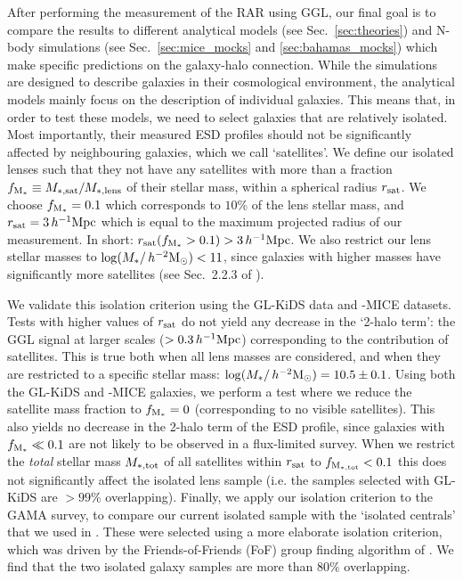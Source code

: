 \documentclass[usenatbib]{mnras}
\newcommand{\hmsun}{\,h^{-2} {\rm M_\odot}}
\newcommand{\hMpc}{\, h^{-1}{\rm{Mpc}} }
\newcommand{\un}[1]{_{\rm #1}}
\begin{document}
After performing the measurement of the RAR using GGL, our final goal is to compare the results to different analytical models (see Sec.~\ref{sec:theories}) and N-body simulations (see Sec.~\ref{sec:mice_mocks} and \ref{sec:bahamas_mocks}) which make specific predictions on the galaxy-halo connection. While the simulations are designed to describe galaxies in their cosmological environment, the analytical models mainly focus on the description of individual galaxies. This means that, in order to test these models, we need to select galaxies that are relatively isolated. Most importantly, their measured ESD profiles should not be significantly affected by neighbouring galaxies, which we call `satellites'. We define our isolated lenses such that they not have any satellites with more than a fraction $f\un{M_*} \equiv M\un{*,sat}/M\un{*,lens}$ of their stellar mass, within a spherical radius $r\un{sat}$. We choose $f\un{M_*}=0.1$ which corresponds to $10\%$ of the lens stellar mass, and $r\un{sat}=3\hMpc$ which is equal to the maximum projected radius of our measurement. In short: $r\un{sat}(f\un{M_*}>0.1)>3\hMpc$. We also restrict our lens stellar masses to $\log(M_*/\hmsun)<11$, since galaxies with higher masses have significantly more satellites (see Sec.~2.2.3 of \citealp{brouwer2017}).

We validate this isolation criterion using the GL-KiDS data and -MICE datasets. Tests with higher values of $r\un{sat}$ do not yield any decrease in the `2-halo term': the GGL signal at larger scales ($>0.3\hMpc$) corresponding to the contribution of satellites. This is true both when all lens masses are considered, and when they are restricted to a specific stellar mass: $\log(M_*/\hmsun)=10.5\pm0.1$. Using both the GL-KiDS and -MICE galaxies, we perform a test where we reduce the satellite mass fraction to $f\un{M_*}=0$ (corresponding to no visible satellites). This also yields no decrease in the 2-halo term of the ESD profile, since galaxies with $f\un{M_*}\ll0.1$ are not likely to be observed in a flux-limited survey. When we restrict the \emph{total} stellar mass $M\un{*,tot}$ of all satellites within $r\un{sat}$ to $f\un{M\un{*,tot}}<0.1$ this does not significantly affect the isolated lens sample (i.e. the samples selected with GL-KiDS are $>99\%$ overlapping). Finally, we apply our isolation criterion to the GAMA survey, to compare our current isolated sample with the `isolated centrals' that we used in \cite{brouwer2017}. These were selected using a more elaborate isolation criterion, which was driven by the Friends-of-Friends (FoF) group finding algorithm of \cite{robotham2011}. We find that the two isolated galaxy samples are more than $80\%$ overlapping.
\end{document}
